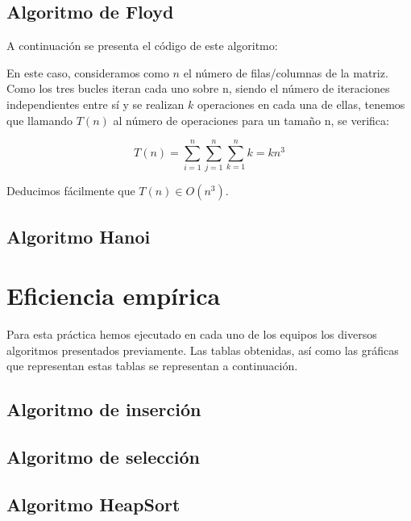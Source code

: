 \documentclass{homework}
\begin{document}
    \subsection{Algoritmo de Floyd}

    A continuación se presenta el código de este algoritmo:

    

    En este caso, consideramos como $n$ el número de filas/columnas de la matriz. Como los tres bucles iteran cada uno sobre n, siendo el número de iteraciones
    independientes entre sí y se realizan $k$ operaciones en cada una de ellas, tenemos que llamando $T(n)$ al número de operaciones para un tamaño n, se verifica:
    
    \begin{equation*}
        T(n) = \sum_{i=1}^n \sum_{j=1}^{n} \sum_{k=1}^{n} k = kn^3
    \end{equation*}

    Deducimos fácilmente que $T(n) \in O(n^3)$. 
    
    \subsection{Algoritmo Hanoi}
    
     

    

    \section{Eficiencia empírica}

    Para esta práctica hemos ejecutado en cada uno de los equipos los diversos algoritmos presentados previamente.
    Las tablas obtenidas, así como las gráficas que representan estas tablas se representan a continuación.

    \subsection{Algoritmo de inserción}
    \subsection{Algoritmo de selección}
    \subsection{Algoritmo HeapSort}
\end{document}
